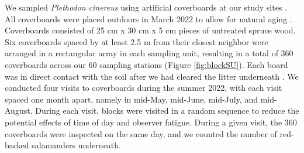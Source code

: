 We sampled \textit{Plethodon cinereus} using artificial coverboards at our study sites \citep{hydeSamplingPlethodontidSalamanders2001,mooreComparisonPopulationEastern2009c,hesedUncoveringSalamanderEcology2012,Mazerolle2021Woodlandsalamander}. 
All coverboards were placed outdoors in March 2022 to allow for natural aging \citep{hedrickEffectsCoverboardAge2021,Grasser2014Effectscover}. 
Coverboards consisted of 25 cm x 30 cm x 5 cm pieces of untreated spruce wood. 
Six coverboards spaced by at least 2.5 m from their closest neighbor were arranged in a rectangular array in each sampling unit, resulting in a total of 360 coverboards across our 60 sampling stations (Figure \ref{fig:blockSU}). 
Each board was in direct contact with the soil after we had cleared the litter underneath \citep{Mazerolle2021Woodlandsalamander}. 
We conducted four visits to coverboards during the summer 2022, with each visit spaced one month apart, namely in mid-May, mid-June, mid-July, and mid-August. 
During each visit, blocks were visited in a random sequence to reduce the potential effects of time of day and observer fatigue. 
During a given visit, the 360 coverboards were inspected on the same day, and we counted the number of red-backed salamanders underneath. 

